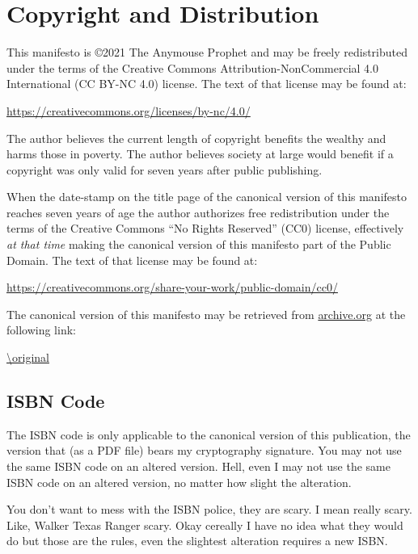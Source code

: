 \section{Copyright and Distribution}

This manifesto is \copyright 2021 The Anymouse Prophet and may be freely redistributed under the terms of the Creative Commons Attribution-NonCommercial 4.0 International (CC BY-NC 4.0) license. The text of that license may be found at:

\bigskip

\url{https://creativecommons.org/licenses/by-nc/4.0/}

\bigskip

\noindent The author believes the current length of copyright benefits the wealthy and harms those in poverty. The author believes society at large would benefit if a copyright was only valid for seven years after public publishing.

When the date-stamp on the title page of the canonical version of this manifesto reaches seven years of age the author authorizes free redistribution under the terms of the Creative Commons ``No Rights Reserved'' (CC0) license, effectively \emph{at that time} making the canonical version of this manifesto part of the Public Domain. The text of that license may be found at:

\bigskip

\url{https://creativecommons.org/share-your-work/public-domain/cc0/}

\bigskip

\noindent The canonical version of this manifesto may be retrieved from \url{archive.org} at the following link:

\bigskip

\url{\original}

\subsection{ISBN Code}

The ISBN code is only applicable to the canonical version of this publication, the version that (as a PDF file) bears my cryptography signature. You may not use the same ISBN code on an altered version. Hell, even I may not use the same ISBN code on an altered version, no matter how slight the alteration.

You don't want to mess with the ISBN police, they are scary. I mean really scary. Like, Walker Texas Ranger scary. Okay cereally I have no idea what they would do but those are the rules, even the slightest alteration requires a new ISBN.

